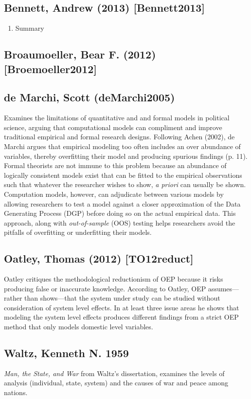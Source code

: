 \documentclass[11pt]{article}
\begin{document}
\subsection{Bennett, Andrew (2013) [Bennett2013]}
\label{sec-2-2}
\begin{enumerate}
\item Summary
\label{sec-2-2-1}
\end{enumerate}

\subsection{Broaumoeller, Bear F. (2012) [Broemoeller2012]}
\label{sec-2-3}
\subsection{de Marchi, Scott (deMarchi2005)}
\label{sec-2-4}
Examines the limitations of quantitative and and formal models in
political science, arguing that computational models can compliment
and improve traditional empirical and formal research designs.
Following Achen (2002), de Marchi argues that empirical modeling too
often includes an over abundance of variables, thereby overfitting
their model and producing spurious findings (p. 11). Formal theorists
are not immune to this problem because an abundance of logically
consistent models exist that can be fitted to the empirical
observations such that whatever the researcher wishes to show, \emph{a
priori} can usually be shown. Computation models, however, can
adjudicate between various models by allowing researchers to test a
model against a closer approximation of the Data Generating Process
(DGP) before doing so on the actual empirical data. This approach,
along with \emph{out-of-sample} (OOS) testing helps researchers avoid the
pitfalls of overfitting or underfitting their models.   
\subsection{Oatley, Thomas (2012) [TO12reduct]}
\label{sec-2-5}
Oatley critiques the methodological reductionism of OEP because it
risks producing false or inaccurate knowledge. According to Oatley,
OEP assumes---rather than shows---that the system under study can be
studied without consideration of system level effects. In at least
three issue areas he shows that modeling the system level effects
produces different findings from a strict OEP method that only models
domestic level variables. 
\subsection{Waltz, Kenneth N. 1959}
\label{sec-2-6}
\emph{Man, the State, and War} from Waltz's dissertation, examines the
levels of analysis (individual, state, system) and the causes of war
and peace among nations. 
\end{document}
